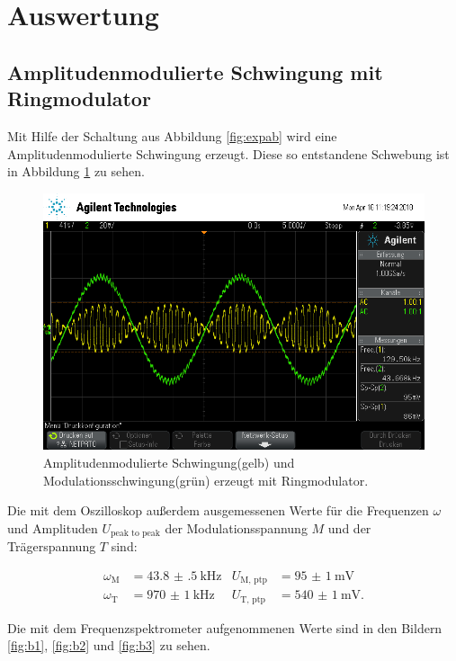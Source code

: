 \section{Auswertung}
\label{sec:Auswertung}

\subsection{Amplitudenmodulierte Schwingung mit Ringmodulator}

Mit Hilfe der Schaltung aus Abbildung \ref{fig:expab} wird eine Amplitudenmodulierte Schwingung erzeugt.
Diese so entstandene Schwebung ist in Abbildung \ref{fig:amplModOszi} zu sehen.

\begin{figure}[h]
  \centering
  \includegraphics[width=.9\textwidth]{Oszi_Pics/amplModRing.png}
  \caption{Amplitudenmodulierte Schwingung(gelb) und Modulationsschwingung(grün) erzeugt mit Ringmodulator.}
  \label{fig:amplModOszi}
\end{figure}

Die mit dem Oszilloskop außerdem ausgemessenen Werte für die Frequenzen $\omega$ und Amplituden $U_\text{peak to peak}$ der Modulationsspannung $M$ und der Trägerspannung $T$ sind:

\begin{align*}
  \omega_\text{M} &= \SI{43.8(5)}{\kilo\hertz} & U_\text{M, ptp} &= \SI{95(1)}{\milli\volt}\\
  \omega_\text{T} &= \SI{970(1)}{\kilo\hertz} & U_\text{T, ptp} &= \SI{540(1)}{\milli\volt}.
\end{align*}

Die mit dem Frequenzspektrometer aufgenommenen Werte sind in den Bildern \ref{fig:b1}, \ref{fig:b2} und \ref{fig:b3} zu sehen.


